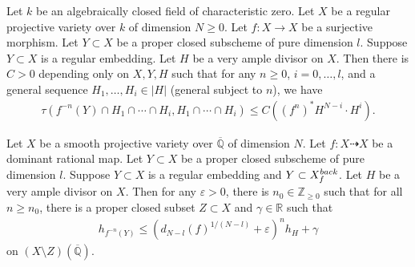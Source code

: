 \documentclass[10pt,a4paper]{amsart}
\def\QQ{\overline{\mathbb Q}}
\def\R{{\mathbb R}}
\def\Z{{\mathbb Z}}
\newcommand{\e}{\varepsilon}
\newcommand{\g}{\gamma}
\begin{document}
\begin{proposition}\label{prop:boundoftaudyn}
Let $k$ be an algebraically closed field of characteristic zero.
Let $X$ be a regular projective variety over $k$ of dimension $N \geq 0$.
Let $f \colon X \longrightarrow X$ be a surjective morphism.
Let $Y \subset X$ be a proper closed subscheme of pure dimension $l$.
Suppose $Y \subset X$ is a regular embedding.
Let $H$ be a very ample divisor on $X$.
Then there is $C > 0$ depending only on $X, Y, H$ such that
for any $n \geq 0$, $i=0,\dots, l$, and a general sequence $H_{1}, \dots, H_{i} \in |H|$
(general subject to $n$), we have
\begin{align}
\tau(f^{-n}(Y) \cap H_{1} \cap \cdots \cap H_{i}, H_{1} \cap \cdots \cap H_{i}) \leq C ((f^{n})^{*} H^{N-i} \cdot H^{i}  ).
\end{align}
\end{proposition}

\begin{proposition}\label{prop:ggcdpullbackbound}
Let $X$ be a smooth projective variety over $\QQ$ of dimension $N$.
Let $f \colon X \dashrightarrow X$ be a dominant rational map.
Let $Y \subset X$ be a proper closed subscheme of pure dimension $l$.
Suppose $Y \subset X$ is a regular embedding and $Y \subset X_{f}^{\rm back}$.
Let $H$ be a very ample divisor on $X$.
Then for any $\e >0$, there is $n_{0} \in \Z_{\geq 0}$
such that for all $n \geq n_{0}$, there is a proper closed subset $Z \subset X$
and $\g \in \R$ such that
\begin{align}
h_{f^{-n}(Y)} \leq (d_{N-l}(f)^{1/(N-l)} + \e)^{n} h_{H} + \g
\end{align}
on $(X\setminus Z)(\QQ) $.
\end{proposition}
\end{document}
